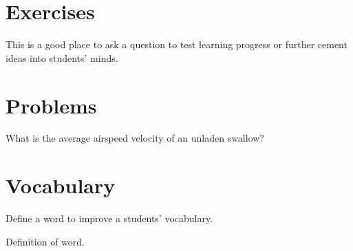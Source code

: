 \documentclass[
	11pt, %
	fleqn, %
	a4paper, %
]{LegrandOrangeBook}
\begin{document}

\section{Exercises}

\begin{exercise} %
	This is a good place to ask a question to test learning progress or further cement ideas into students' minds.
\end{exercise}


\section{Problems}

\begin{problem} %
What is the average airspeed velocity of an unladen swallow?
\end{problem}


\section{Vocabulary}

Define a word to improve a students' vocabulary.

\begin{vocabulary}[Word] %
	Definition of word.
\end{vocabulary}


\chapterspaceabove{6.25cm} %
\chapterspacebelow{7.5cm} %

\end{document}
